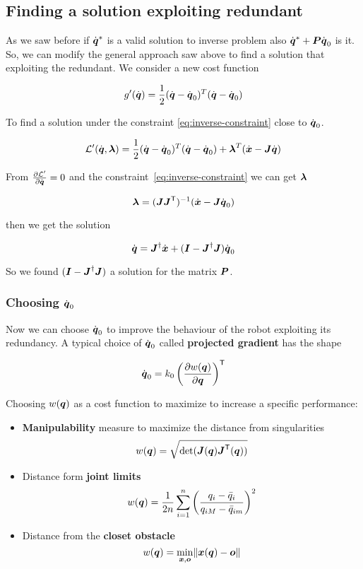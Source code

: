 \subsection{Finding a solution exploiting redundant}

As we saw before if $\dot{\boldsymbol{q}}^*$ is a valid solution to inverse problem also $\dot{\boldsymbol{q}}^* + \boldsymbol{P}\dot{\boldsymbol{q}}_0$ is it.
So, we can modify the general approach saw above to find a solution that exploiting the redundant.
We consider a new cost function

\[ g'(\dot{\boldsymbol{q}}) = \frac{1}{2} (\dot{\boldsymbol{q}} - \dot{\boldsymbol{q}}_0)^T (\dot{\boldsymbol{q}} - \dot{\boldsymbol{q}}_0) \]

To find a solution under the constraint \ref{eq:inverse-constraint} close to $\dot{\boldsymbol{q}}_0$.

\[ \mathcal{L}'(\dot{\boldsymbol{q}}, \boldsymbol{\lambda}) = \frac{1}{2} (\dot{\boldsymbol{q}} - \dot{\boldsymbol{q}}_0)^T (\dot{\boldsymbol{q}} - \dot{\boldsymbol{q}}_0) + \boldsymbol{\lambda}^T (\dot{\boldsymbol{x}} - \boldsymbol{J} \dot{\boldsymbol{q}}) \]

From $\frac{\partial \mathcal{L}'}{\partial \dot{\boldsymbol{q}}} = 0$ and the constraint~\ref{eq:inverse-constraint} we can get $\boldsymbol{\lambda}$

\[\boldsymbol{\lambda} = (\boldsymbol{J}\boldsymbol{J}^{\mathsf{T}})^{-1} (\dot{\boldsymbol{x}} - \boldsymbol{J}\dot{\boldsymbol{q}}_0)\]

then we get the solution

\begin{equation}
    \dot{\boldsymbol{q}} = \boldsymbol{J}^\dag \dot{\boldsymbol{x}} + (\boldsymbol{I} - \boldsymbol{J}^\dag \boldsymbol{J}) \dot{\boldsymbol{q}}_0\label{eq:solution-null-space-method-redundancy}
\end{equation}

So we found $(\boldsymbol{I} - \boldsymbol{J}^\dag \boldsymbol{J})$ a solution for the matrix $\boldsymbol{P}$.

\subsubsection{Choosing \texorpdfstring{$\dot{\boldsymbol{q}}_0$}{dq0}}

Now we can choose $\dot{\boldsymbol{q}}_0$ to improve the behaviour of the robot exploiting its redundancy.
A typical choice of $\dot{\boldsymbol{q}}_0$ called \textbf{projected gradient} has the shape

\[ \dot{\boldsymbol{q}}_0 = k_0 \left(\frac{\partial w(\boldsymbol{q})}{\partial \boldsymbol{q}}\right)^{\mathsf{T}} \]

Choosing $w(\boldsymbol{q})$ as a cost function to maximize to increase a specific performance:

\begin{itemize}
	\item \textbf{Manipulability} measure to maximize the distance from singularities
	\[ w(\boldsymbol{q}) = \sqrt{\det(\boldsymbol{J}(\boldsymbol{q})\boldsymbol{J}^{\mathsf{T}}(\boldsymbol{q}))} \]

	\item Distance form \textbf{joint limits}
	\[ w(\boldsymbol{q}) = \frac{1}{2n} \sum_{i=1}^{n} \left( \frac{q_i - \bar{q}_i}{q_{iM} - \bar{q}_{im}} \right)^2 \]

	\item Distance from the \textbf{closet obstacle}
	\[ w(\boldsymbol{q}) = \min_{\boldsymbol{x},\boldsymbol{o}}\lVert\boldsymbol{x}(\boldsymbol{q})-\boldsymbol{o}\rVert \]
\end{itemize}

